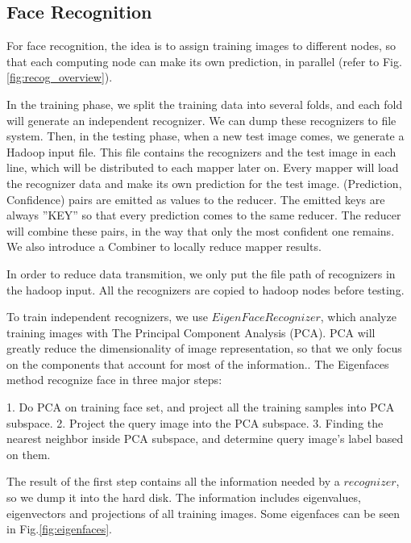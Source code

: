 \documentclass[11pt, draftclsnofoot, onecolumn]{IEEEtran}
\begin{document}
\subsection{Face Recognition}

For face recognition, the idea is to assign training images to different nodes, so that each computing node can make its own prediction, in parallel (refer to Fig. \ref{fig:recog_overview}). 

In the training phase, we split the training data into several folds, and each fold will generate an independent recognizer. We can dump these recognizers to file system. Then, in the testing phase, when a new test image comes, we generate a Hadoop input file. This file contains the recognizers and the test image in each line, which will be distributed to each mapper later on. Every mapper will load the recognizer data and make its own prediction for the test image. (Prediction, Confidence) pairs are emitted as values to the reducer. The emitted keys are always ''KEY'' so that every prediction comes to the same reducer. The reducer will combine these pairs, in the way that only the most confident one remains. We also introduce a Combiner to locally reduce mapper results.

In order to reduce data transmition, we only put the file path of recognizers in the hadoop input. All the recognizers are copied to hadoop nodes before testing.

To train independent recognizers, we use $EigenFaceRecognizer$, which analyze training images with The Principal Component Analysis (PCA). PCA will greatly reduce the dimensionality of image representation, so that we only focus on the components that account for most of the information.\cite{faceRecognizer}. The Eigenfaces method recognize face in three major steps:

1. Do PCA on training face set, and project all the training samples into PCA subspace.
2. Project the query image into the PCA subspace.
3. Finding the nearest neighbor inside PCA subspace, and determine query image’s label based on them.

The result of the first step contains all the information needed by a $recognizer$, so we dump it into the hard disk. The information includes eigenvalues, eigenvectors and projections of all training images. Some eigenfaces can be seen in Fig.\ref{fig:eigenfaces}.
\end{document}
